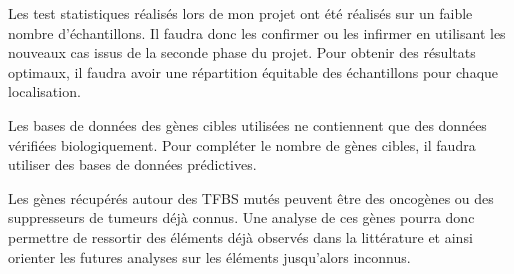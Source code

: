 Les test statistiques réalisés lors de mon projet ont été réalisés sur un faible nombre d'échantillons. Il faudra donc les confirmer ou les infirmer en utilisant les nouveaux cas issus de la seconde phase du projet. Pour obtenir des résultats optimaux, il faudra avoir une répartition équitable des échantillons pour chaque localisation.

Les bases de données des gènes cibles utilisées ne contiennent que des données vérifiées biologiquement. Pour compléter le nombre de gènes cibles, il faudra utiliser des bases de données prédictives.

Les gènes récupérés autour des TFBS mutés peuvent être des oncogènes ou des suppresseurs de tumeurs déjà connus. Une analyse de ces gènes pourra donc permettre de ressortir des éléments déjà observés dans la littérature et ainsi orienter les futures analyses sur les éléments jusqu'alors inconnus.




